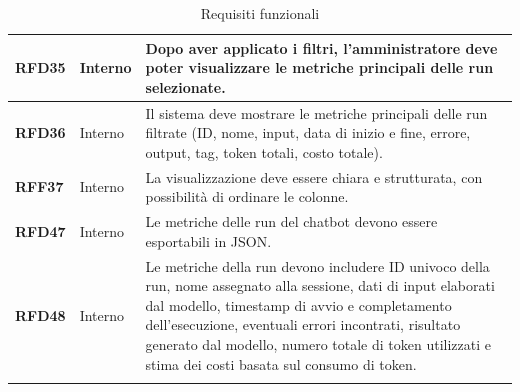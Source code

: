 \documentclass{article}
\newcommand{\isEsterno}{1}
\begin{document}
\begin{longtable}{|>{\centering\arraybackslash}m{}|>{\centering\arraybackslash}m{}|>{\arraybackslash}m{}|}
    	\hline
    	\textbf{RFD35} & Interno 			& Dopo aver applicato i filtri, l’amministratore deve poter visualizzare le metriche principali delle run selezionate. \\
    	\hline
    	\textbf{RFD36} & Interno 			& Il sistema deve mostrare le metriche principali delle run filtrate (ID, nome, input, data di inizio e fine, errore, output, tag, token totali, costo totale). \\
    	\hline
    	\textbf{RFF37} & Interno 			& La visualizzazione deve essere chiara e strutturata, con possibilità di ordinare le colonne. \\
    	\hline
    	\textbf{RFD47} & Interno 			& Le metriche delle run del chatbot devono essere esportabili in JSON. \\
    	\hline
    	\textbf{RFD48} & Interno 			& Le metriche della run devono includere ID univoco della run, nome assegnato alla sessione, dati di input elaborati dal modello, timestamp di avvio e completamento dell'esecuzione, eventuali errori incontrati, risultato generato dal modello, numero totale di token utilizzati e stima dei costi basata sul consumo di token. \\
    	\hline
    	\caption{Requisiti funzionali}
    \end{longtable}
    






\ifthenelse{\equal{\isEsterno}{1}}{
    \begin{table}[b]
        \begin{tabular}{@{}p{.5in}p{4in}@{}}
            Data:  & \hrulefill \\
                   &     		\\
                   &     		\\
            Firma: & \hrulefill \\
        \end{tabular}
        \end{table}
}{}
\end{document}
